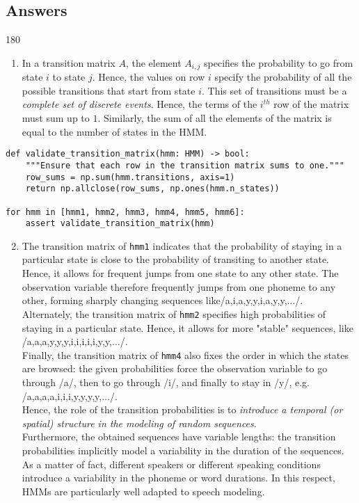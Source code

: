 \documentclass[11pt]{article}
\newenvironment{answer}{\begin{turn}{180}\begin{minipage}[t]{\linewidth}\begin{itshape}}{\end{itshape}\end{minipage}\end{turn}}
\begin{document}
\subsection{Answers}
\label{sec:orgf1d37db}
\begin{answer}
\begin{enumerate}
\item In a transition matrix \(A\), the element \(A_{i,j}\) specifies the
probability to go from state \(i\) to state \(j\). Hence, the values on
row \(i\) specify the probability of all the possible transitions that
start from state \(i\). This set of transitions must be a \emph{complete set
of discrete events}. Hence, the terms of the \(i^{th}\) row of the
matrix must sum up to \(1\). Similarly, the sum of all the elements of
the matrix is equal to the number of states in the HMM.
\end{enumerate}

\begin{verbatim}
def validate_transition_matrix(hmm: HMM) -> bool:
    """Ensure that each row in the transition matrix sums to one."""
    row_sums = np.sum(hmm.transitions, axis=1)
    return np.allclose(row_sums, np.ones(hmm.n_states))

for hmm in [hmm1, hmm2, hmm3, hmm4, hmm5, hmm6]:
    assert validate_transition_matrix(hmm)
\end{verbatim}

\begin{enumerate}
\setcounter{enumi}{1}
\item The transition matrix of \texttt{hmm1} indicates that the probability of
staying in a particular state is close to the probability of
transiting to another state. Hence, it allows for frequent jumps from
one state to any other state. The observation variable therefore
frequently jumps from one phoneme to any other, forming sharply
changing sequences like ​/a,i,a,y,y,i,a,y,y,\(\ldots\)​/.\\
Alternately, the transition matrix of \texttt{hmm2} specifies high
probabilities of staying in a particular state. Hence, it allows for
more "stable" sequences, like ​/a,a,a,y,y,y,i,i,i,i,i,y,y,\(\ldots\)​/.\\
Finally, the transition matrix of \texttt{hmm4} also fixes the order in
which the states are browsed: the given probabilities force the
observation variable to go through ​/a​/, then to go through ​/i​/, and
finally to stay in ​/y​/, e.g. ​/a,a,a,a,i,i,i,y,y,y,y,\(\ldots\)​/.\\
Hence, the role of the transition probabilities is to \emph{introduce a
temporal (or spatial) structure in the modeling of random sequences}.\\
Furthermore, the obtained sequences have variable lengths: the
transition probabilities implicitly model a variability in the duration
of the sequences. As a matter of fact, different speakers or different
speaking conditions introduce a variability in the phoneme or word
durations. In this respect, HMMs are particularly well adapted to speech
modeling.


\end{enumerate}
\end{answer}
\end{document}
